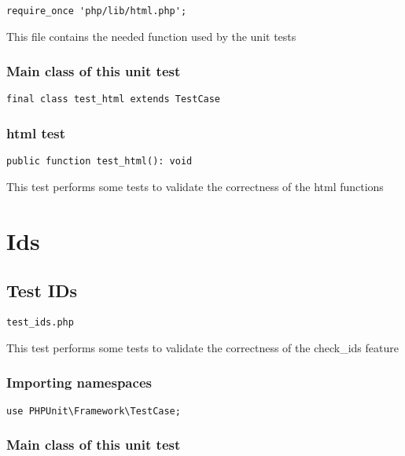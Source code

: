 \documentclass[a4paper]{article}
\begin{document}
\begin{lstlisting}
require_once 'php/lib/html.php';
\end{lstlisting}

This file contains the needed function used by the unit tests

\hypertarget{toc236}{}
\subsubsection{Main class of this unit test}

\begin{lstlisting}
final class test_html extends TestCase
\end{lstlisting}

\hypertarget{toc237}{}
\subsubsection{html test}

\begin{lstlisting}
public function test_html(): void
\end{lstlisting}

This test performs some tests to validate the correctness
of the html functions


\hypertarget{toc238}{}
\section{Ids}

\hypertarget{toc239}{}
\subsection{Test IDs}

\begin{lstlisting}
test_ids.php
\end{lstlisting}

This test performs some tests to validate the correctness
of the check\_ids feature

\hypertarget{toc240}{}
\subsubsection{Importing namespaces}

\begin{lstlisting}
use PHPUnit\Framework\TestCase;
\end{lstlisting}

\hypertarget{toc241}{}
\subsubsection{Main class of this unit test}
\end{document}
